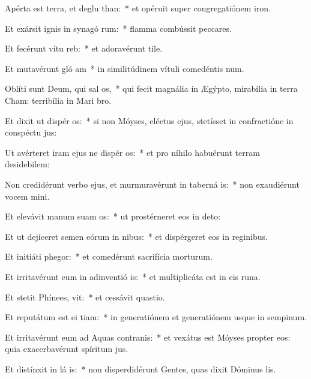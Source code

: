 \item Apérta est terra, et deglu than:~* et opéruit super congregatiónem iron.
\item Et exársit ignis in synagó rum:~* flamma combússit peccares.
\item Et fecérunt vítu  reb:~* et adoravérunt tile.
\item Et mutavérunt gló am~* in similitúdinem vítuli comedéntis num.
\item Oblíti sunt Deum, qui sal os,~* qui fecit magnália in Ægýpto, mirabília in terra Cham: terribília in Mari bro.
\item Et dixit ut dispér os:~* si non Móyses, eléctus ejus, stetísset in confractióne in conspéctu jus:
\item Ut avérteret iram ejus ne dispér os:~* et pro níhilo habuérunt terram desidebilem:
\item Non credidérunt verbo ejus, et murmuravérunt in taberná is:~* non exaudiérunt vocem mini.
\item Et elevávit manum suam  os:~* ut prostérneret eos in deto:
\item Et ut dejíceret semen eórum in nibus:~* et dispérgeret eos in reginibus.
\item Et initiáti  phegor:~* et comedérunt sacrifícia morturum.
\item Et irritavérunt eum in adinventió is:~* et multiplicáta est in eis runa.
\item Et stetit Phínees,  vit:~* et cessávit quastio.
\item Et reputátum est ei  tiam:~* in generatiónem et generatiónem usque in sempinum.
\item Et irritavérunt eum ad Aquas contranis:~* et vexátus est Móyses propter eos: quia exacerbavérunt spíritum jus.
\item Et distínxit in lá is:~* non disperdidérunt Gentes, quas dixit Dóminus lis.
